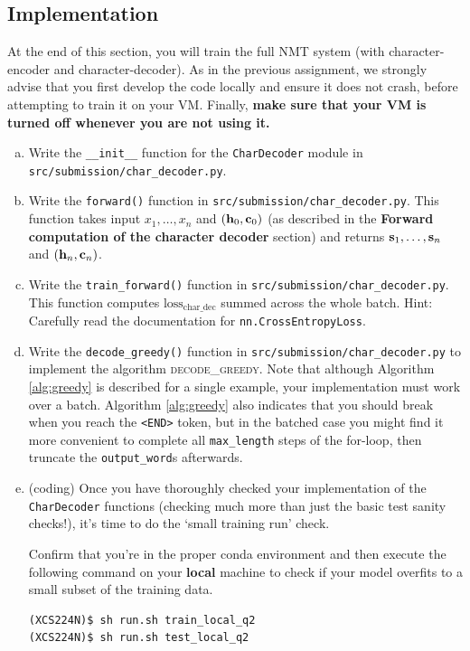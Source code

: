 \subsection*{Implementation}
At the end of this section, you will train the full NMT system (with character-encoder and character-decoder). 
As in the previous assignment, we strongly advise that you first develop the code locally and ensure it does not crash, before attempting to train it on your VM.
Finally, \textbf{make sure that your VM is turned off whenever you are not using it.}
\begin{enumerate}[(a)]
    \item {} Write the \texttt{\_\_init\_\_} function for the \texttt{CharDecoder} module in \texttt{src/submission/char\_decoder.py}.
    
    \item {} Write the \texttt{forward()}  function in \texttt{src/submission/char\_decoder.py}. This function takes input $x_1,\dots,x_n$ and $(\mathbf{h}_0, \mathbf{c}_0)$ (as described in the \textbf{Forward computation of the character decoder} section) and returns $\mathbf{s}_1,\dots,\mathbf{s}_n$ and $(\mathbf{h}_n, \mathbf{c}_n)$.

    \item {} Write the \texttt{train\_forward()} function in \texttt{src/submission/char\_decoder.py}. This function computes $\text{loss}_\text{char\_dec}$ summed across the whole batch. Hint: Carefully read the documentation for \texttt{nn.CrossEntropyLoss}.

    \item {} Write the \texttt{decode\_greedy()} function in \texttt{src/submission/char\_decoder.py} to implement the algorithm \textsc{decode\_greedy}. 
    Note that although Algorithm \ref{alg:greedy} is described for a single example, your implementation must work over a batch.
    Algorithm \ref{alg:greedy} also indicates that you should break when you reach the \texttt{<END>} token, but in the batched case you might find it more convenient to complete all \texttt{max\_length} steps of the for-loop, then truncate the \texttt{output\_word}s afterwards.

    \item {} \label{qn:run_tiny_dec} (coding) Once you have thoroughly checked your implementation of the \texttt{CharDecoder} functions (checking much more than just the basic test sanity checks!), it's time to do the `small training run' check.
    
    Confirm that you're in the proper conda environment and then execute the following command on your \textbf{local} machine to check if your model overfits to a small subset of the training data.
\begin{lstlisting}
(XCS224N)$ sh run.sh train_local_q2
(XCS224N)$ sh run.sh test_local_q2
\end{lstlisting}


\end{enumerate}
